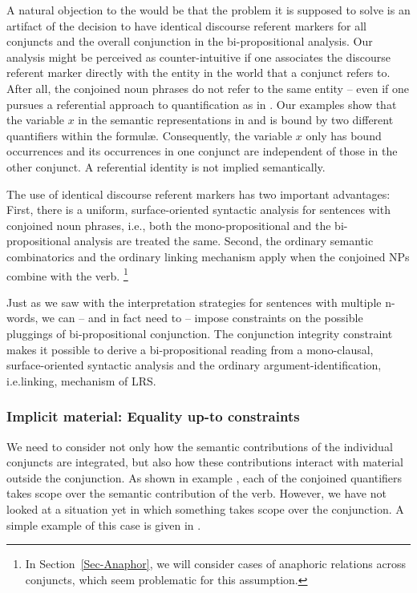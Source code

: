 \documentclass[output=paper]{langsci/langscibook}
\begin{document}
A natural objection to the \CCB{} would be that the problem it is supposed to solve is an artifact of the decision to have identical discourse referent markers for all conjuncts and the overall conjunction in the bi-propositional analysis. 
Our analysis might be perceived as counter-intuitive if one associates the discourse referent marker directly with the entity in the world that a conjunct refers to. After all, the conjoined noun phrases do not refer to the same entity -- even if one pursues a referential approach to quantification as in \citet{Luecking:Ginzburg:19}.
Our examples show that the variable $x$ in the semantic representations in  and  is bound by two different quantifiers within the formulæ. 
Consequently, the variable $x$ only has bound occurrences and its occurrences in one conjunct are independent of those in the other conjunct. 
A referential identity is not implied semantically. 

The use of identical discourse referent markers has two important advantages: 
First, there is a uniform, surface-oriented syntactic analysis for sentences with conjoined noun phrases, i.e., both the mono-propositional and the bi-pro\-po\-si\-tional analysis are treated the same. 
Second, the ordinary semantic combinatorics and the ordinary linking mechanism apply when the conjoined NPs combine with the verb.%
\footnote{In Section~\ref{Sec-Anaphor}, we will consider cases of anaphoric relations across conjuncts, which seem problematic for this assumption.}

Just as we saw with the interpretation strategies for sentences with multiple n-words, we can -- and in fact need to -- impose constraints on the possible pluggings of bi-propositional conjunction. 
The conjunction integrity constraint
makes it possible to derive a bi-propositional reading from a mono-clausal, surface-oriented syntactic analysis and the ordinary argument-identification, i.e.\@ linking, mechanism of LRS.


\subsubsection{Implicit material: Equality up-to constraints}
\label{Sec-EqualityUpto}
We need to consider not only how the semantic contributions of the individual conjuncts are integrated, but also how these contributions interact with material outside the conjunction. 
As shown in example , each of the conjoined quantifiers takes scope over the semantic contribution of the verb. 
However, we have not looked at a situation yet in which something takes scope over the conjunction. 
A simple example of this case is given in .
\end{document}
